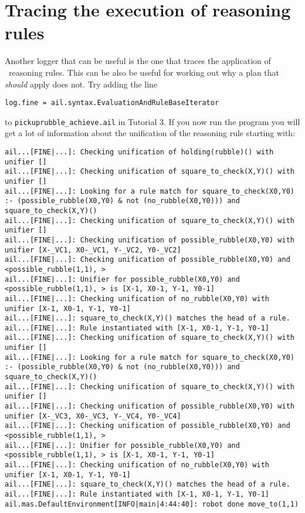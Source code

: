 \section{Tracing the execution of reasoning rules}
Another logger that can be useful is the one that traces the application of \prolog\ reasoning rules.  This can be also be useful for working out why a plan that \emph{should} apply does not.  Try adding the line
\begin{verbatim}
log.fine = ail.syntax.EvaluationAndRuleBaseIterator
\end{verbatim}
to \texttt{pickuprubble\_achieve.ail} in Tutorial 3.  If you now run the program you will get a lot of information about the unification of the reasoning rule starting with:

\begin{small}
\begin{verbatim}
ail...[FINE|...]: Checking unification of holding(rubble)() with unifier [] 
ail...[FINE|...]: Checking unification of square_to_check(X,Y)() with unifier [] 
ail...[FINE|...]: Looking for a rule match for square_to_check(X0,Y0) :- (possible_rubble(X0,Y0) & not (no_rubble(X0,Y0))) and square_to_check(X,Y)() 
ail...[FINE|...]: Checking unification of square_to_check(X,Y)() with unifier [] 
ail...[FINE|...]: Checking unification of possible_rubble(X0,Y0) with unifier [X-_VC1, X0-_VC1, Y-_VC2, Y0-_VC2] 
ail...[FINE|...]: Checking unification of possible_rubble(X0,Y0) and <possible_rubble(1,1), > 
ail...[FINE|...]: Unifier for possible_rubble(X0,Y0) and <possible_rubble(1,1), > is [X-1, X0-1, Y-1, Y0-1] 
ail...[FINE|...]: Checking unification of no_rubble(X0,Y0) with unifier [X-1, X0-1, Y-1, Y0-1] 
ail...[FINE|...]: square_to_check(X,Y)() matches the head of a rule. 
ail...[FINE|...]: Rule instantiated with [X-1, X0-1, Y-1, Y0-1] 
ail...[FINE|...]: Checking unification of square_to_check(X,Y)() with unifier [] 
ail...[FINE|...]: Looking for a rule match for square_to_check(X0,Y0) :- (possible_rubble(X0,Y0) & not (no_rubble(X0,Y0))) and square_to_check(X,Y)() 
ail...[FINE|...]: Checking unification of square_to_check(X,Y)() with unifier [] 
ail...[FINE|...]: Checking unification of possible_rubble(X0,Y0) with unifier [X-_VC3, X0-_VC3, Y-_VC4, Y0-_VC4] 
ail...[FINE|...]: Checking unification of possible_rubble(X0,Y0) and <possible_rubble(1,1), > 
ail...[FINE|...]: Unifier for possible_rubble(X0,Y0) and <possible_rubble(1,1), > is [X-1, X0-1, Y-1, Y0-1] 
ail...[FINE|...]: Checking unification of no_rubble(X0,Y0) with unifier [X-1, X0-1, Y-1, Y0-1] 
ail...[FINE|...]: square_to_check(X,Y)() matches the head of a rule. 
ail...[FINE|...]: Rule instantiated with [X-1, X0-1, Y-1, Y0-1] 
ail.mas.DefaultEnvironment[INFO|main|4:44:40]: robot done move_to(1,1) 
\end{verbatim}
\end{small}

